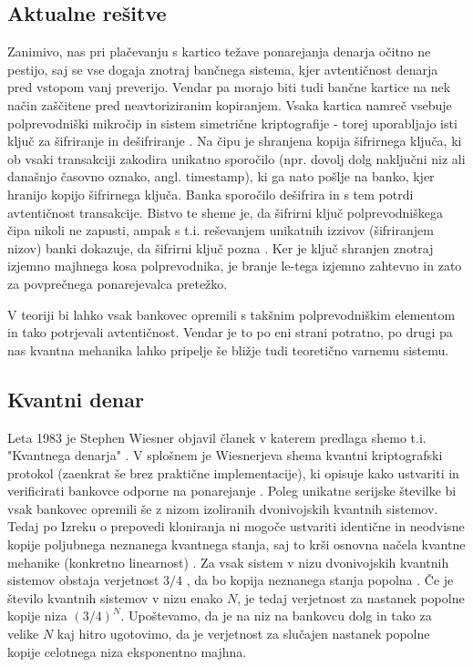 \documentclass[12pt]{article}
\begin{document}
\subsection{Aktualne rešitve}
	
\par Zanimivo, nas pri plačevanju s kartico težave ponarejanja denarja očitno ne pestijo, saj se vse dogaja znotraj bančnega sistema, kjer avtentičnost denarja pred vstopom vanj preverijo. Vendar pa morajo biti tudi bančne kartice na nek način zaščitene pred neavtoriziranim kopiranjem. Vsaka kartica namreč vsebuje polprevodniški mikročip in sistem simetrične kriptografije - torej uporabljajo isti ključ za šifriranje in dešifriranje \cite{CS101IntroductionComputing}. Na čipu je shranjena kopija šifrirnega ključa, ki ob vsaki transakciji zakodira unikatno sporočilo (npr. dovolj dolg naključni niz ali današnjo časovno oznako, angl. timestamp), ki ga nato pošlje na banko, kjer hranijo kopijo šifrirnega ključa. Banka sporočilo dešifrira in s tem potrdi avtentičnost transakcije. Bistvo te sheme je, da šifrirni ključ polprevodniškega čipa nikoli ne zapusti, ampak s t.i. reševanjem unikatnih izzivov (šifriranjem nizov) banki dokazuje, da šifrirni ključ pozna \cite{CS101IntroductionComputing}. Ker je ključ shranjen znotraj izjemno majhnega kosa polprevodnika, je branje le-tega izjemno zahtevno \cite{christopheDescramblingDataReading2006} in zato za povprečnega ponarejevalca pretežko.
\par
V teoriji bi lahko vsak bankovec opremili s takšnim polprevodniškim elementom in tako potrjevali avtentičnost. Vendar je to po eni strani potratno, po drugi pa nas kvantna mehanika lahko pripelje še bližje tudi teoretično varnemu sistemu. 

\subsection{Kvantni denar}

Leta 1983 je Stephen Wiesner objavil članek v katerem predlaga shemo t.i. "Kvantnega denarja" \cite{wiesnerConjugateCoding1983}. V splošnem je Wiesnerjeva shema kvantni kriptografski protokol (zaenkrat še brez praktične implementacije), ki opisuje kako ustvariti in verificirati bankovce odporne na ponarejanje \cite{QuantumMoney2022}. Poleg unikatne serijske številke bi vsak bankovec opremili še z nizom izoliranih dvonivojskih kvantnih sistemov. Tedaj po Izreku o prepovedi kloniranja ni mogoče ustvariti identične in neodvisne kopije poljubnega neznanega kvantnega stanja, saj to krši osnovna načela kvantne mehanike (konkretno linearnost) \cite{NocloningTheorem2022}. Za vsak sistem v nizu dvonivojskih kvantnih sistemov obstaja verjetnost $3/4$ \cite{molinaOptimalCounterfeitingAttacks2012}, da bo kopija  neznanega stanja popolna \cite{QuantumMoney2022}. Če je število kvantnih sistemov v nizu enako $N$, je tedaj verjetnost za nastanek popolne kopije niza $(3/4)^N$. Upoštevamo, da je na niz na bankovcu dolg in tako za velike $N$ kaj hitro ugotovimo, da je verjetnost za slučajen nastanek popolne kopije celotnega niza eksponentno majhna. 
\end{document}

